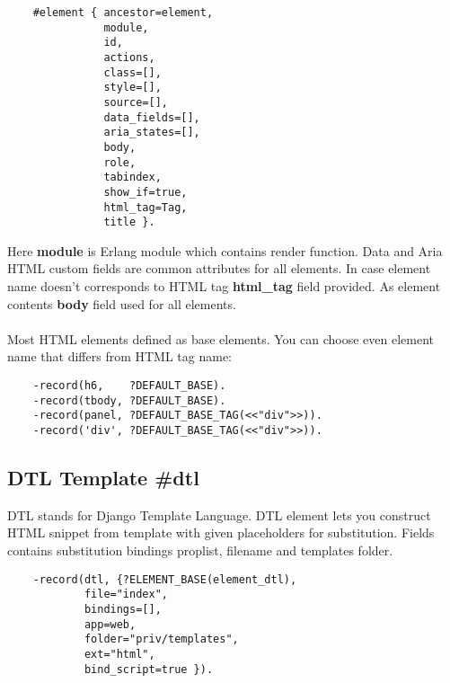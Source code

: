 \vspace{1\baselineskip}
\begin{lstlisting}
    #element { ancestor=element,
               module,
               id,
               actions,
               class=[],
               style=[],
               source=[],
               data_fields=[],
               aria_states=[],
               body,
               role,
               tabindex,
               show_if=true,
               html_tag=Tag,
               title }.
\end{lstlisting}
\vspace{1\baselineskip}

Here {\bf module} is Erlang module which contains render function.
Data and Aria HTML custom fields are common attributes for all elements.
In case element name doesn't corresponds to HTML tag {\bf html\_tag} field provided.
As element contents {\bf body} field used for all elements.

\paragraph{}
Most HTML elements defined as base elements. You can choose even element
name that differs from HTML tag name:

\vspace{1\baselineskip}
\begin{lstlisting}
    -record(h6,    ?DEFAULT_BASE).
    -record(tbody, ?DEFAULT_BASE).
    -record(panel, ?DEFAULT_BASE_TAG(<<"div">>)).
    -record('div', ?DEFAULT_BASE_TAG(<<"div">>)).
\end{lstlisting}
\vspace{1\baselineskip}

\newpage
\subsection{DTL Template {\bf \#dtl}}
DTL stands for Django Template Language. DTL element lets you construct HTML
snippet from template with given placeholders for substitution.
Fields contains substitution bindings proplist, filename and templates folder.

\vspace{1\baselineskip}
\begin{lstlisting}
    -record(dtl, {?ELEMENT_BASE(element_dtl),
            file="index",
            bindings=[],
            app=web,
            folder="priv/templates",
            ext="html",
            bind_script=true }).
\end{lstlisting}
\vspace{1\baselineskip}


